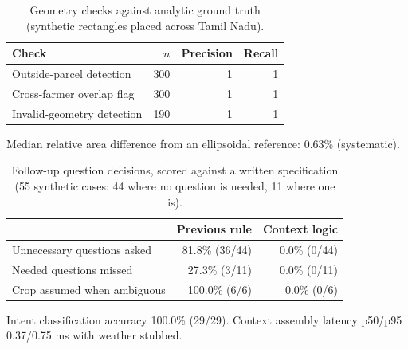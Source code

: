 
\begin{table}[t]
\caption{Geometry checks against analytic ground truth (synthetic rectangles placed across Tamil Nadu).}
\label{tab:geometry}
\centering
\begin{tabular}{lrrr}
\hline
Check & $n$ & Precision & Recall \\
\hline
Outside-parcel detection & 300 & 1 & 1 \\
Cross-farmer overlap flag & 300 & 1 & 1 \\
Invalid-geometry detection & 190 & 1 & 1 \\
\hline
\end{tabular}
\par\smallskip\footnotesize Median relative area difference from an ellipsoidal reference: 0.63\% (systematic).
\end{table}

\begin{table}[t]
\caption{Follow-up question decisions, scored against a written specification (55 synthetic cases: 44 where no question is needed, 11 where one is).}
\label{tab:chat}
\centering
\begin{tabular}{lrr}
\hline
 & Previous rule & Context logic \\
\hline
Unnecessary questions asked & 81.8\% (36/44) & 0.0\% (0/44) \\
Needed questions missed & 27.3\% (3/11) & 0.0\% (0/11) \\
Crop assumed when ambiguous & 100.0\% (6/6) & 0.0\% (0/6) \\
\hline
\end{tabular}
\par\smallskip\footnotesize Intent classification accuracy 100.0\% (29/29). Context assembly latency p50/p95 0.37/0.75 ms with weather stubbed.
\end{table}

